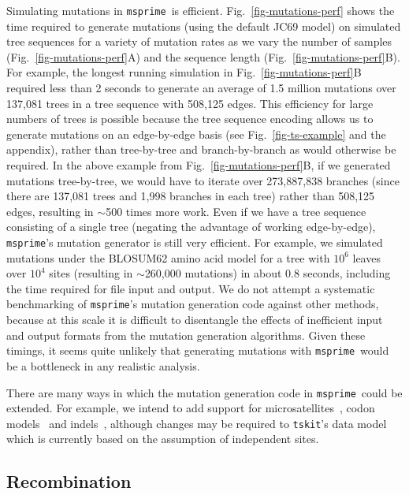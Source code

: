 \documentclass{article}
\newcommand{\msprime}[0]{\texttt{msprime}}
\newcommand{\tskit}[0]{\texttt{tskit}}
\begin{document}
Simulating mutations in \msprime\ is efficient.
Fig.~\ref{fig-mutations-perf} shows the time required to generate
mutations (using the default JC69 model) on
simulated tree sequences for a variety of mutation
rates as we vary the number of samples
(Fig.~\ref{fig-mutations-perf}A) and the sequence
length (Fig.~\ref{fig-mutations-perf}B).
For example, the longest running simulation in
Fig.~\ref{fig-mutations-perf}B required less than 2 seconds to
generate an average of 1.5 million mutations over 137,081 trees
in a tree sequence with 508,125 edges.
This efficiency for large numbers of trees is possible because
the tree sequence encoding allows us to generate mutations
on an edge-by-edge basis
(see Fig.~\ref{fig-ts-example} and the~
appendix),
rather than tree-by-tree and branch-by-branch as would otherwise be required.
In the above example from Fig.~\ref{fig-mutations-perf}B,
if we generated mutations tree-by-tree, we would have to iterate over 273,887,838 branches
(since there are 137,081 trees and 1,998 branches in each
tree) rather than 508,125 edges, resulting in $\sim$500 times more work.
Even if we have a tree sequence consisting of a single tree
(negating the advantage of working edge-by-edge),
\msprime's mutation generator is still very efficient.
For example, we simulated mutations under the BLOSUM62 amino
acid model for a tree with $10^6$ leaves over $10^4$ sites (resulting
in $\sim$260,000 mutations) in about $0.8$ seconds, including
the time required for file input and output.
We do not attempt a systematic benchmarking of \msprime's
mutation generation code against other methods, because at this scale it is
difficult to disentangle the effects of inefficient input and
output formats from the mutation generation algorithms.
Given these timings, it seems quite unlikely
that generating mutations with \msprime\ would be a bottleneck in any
realistic analysis.

There are many ways in which the mutation generation code
in \msprime\ could be extended. For example, we intend to add support for
microsatellites~\citep{mailund2005coasim},
codon models~\citep{arenas2007recodon}
and indels~\citep{cartwright2005dna,fletcher2009indelible},
although changes may be required to \tskit's data model
which is currently based on the assumption of independent sites.

\subsection*{Recombination}
\end{document}
